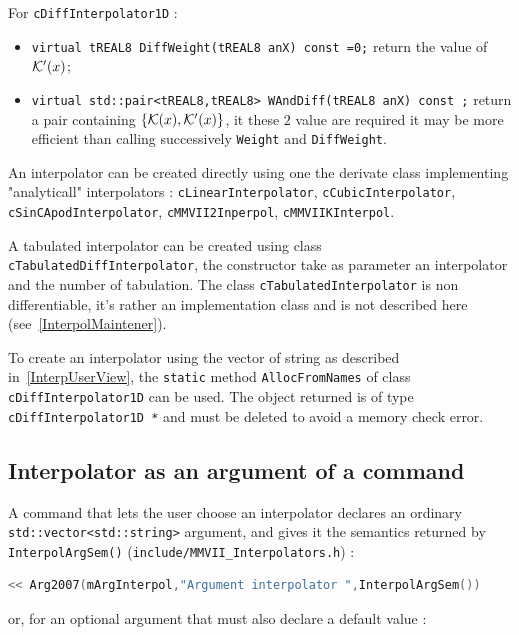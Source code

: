 For {\tt cDiffInterpolator1D} :

\begin{itemize}
    \item   {\tt virtual tREAL8  DiffWeight(tREAL8  anX) const =0;}  return the value of $\mathcal K'(x)$;

    \item {\tt virtual std::pair<tREAL8,tREAL8>  WAndDiff(tREAL8  anX) const ;}  return a pair containing
          $\{\mathcal K(x),\mathcal K'(x)\}$, it these $2$ value are required it may be more efficient than calling
          successively {\tt Weight} and {\tt DiffWeight}.
\end{itemize}

An interpolator can be created directly using one the derivate class implementing "analyticall"
interpolators :  {\tt cLinearInterpolator}, {\tt cCubicInterpolator}, {\tt cSinCApodInterpolator},
{\tt cMMVII2Inperpol}, {\tt cMMVIIKInterpol}.


A tabulated interpolator can be created using class {\tt cTabulatedDiffInterpolator},
the constructor take as parameter an interpolator and the number of tabulation.
The class {\tt cTabulatedInterpolator} is non differentiable, it's rather an implementation
class and is not described here (see~\ref{InterpolMaintener}).


To create an interpolator using the vector of string as described in~\ref{InterpUserView},
the {\tt static}  method {\tt AllocFromNames} of class {\tt cDiffInterpolator1D} can be used.
The object returned is of type {\tt cDiffInterpolator1D *} and must be deleted to avoid
a memory check error.


\subsection{Interpolator as an argument of a command}
\label{InterpolArgOfCmd}

A command that lets the user choose an interpolator declares an ordinary
{\tt std::vector<std::string>} argument, and gives it the semantics returned by
{\tt InterpolArgSem()}  ({\tt include/MMVII\_Interpolators.h}) :

\begin{lstlisting}[language=C++]
   << Arg2007(mArgInterpol,"Argument interpolator ",InterpolArgSem())
\end{lstlisting}

or, for an optional argument that must also declare a default value :

